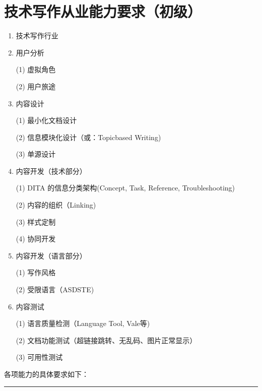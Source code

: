 \documentclass[letterpaper,10pt,english]{sphinxmanual}
\begin{document}
\chapter{技术写作从业能力要求（初级）}
\label{\detokenize{about/tw-comp-model:tw-comp-model}}\label{\detokenize{about/tw-comp-model:id1}}\label{\detokenize{about/tw-comp-model::doc}}\begin{enumerate}
%
\item {} 
\sphinxAtStartPar
技术写作行业

\item {} 
\sphinxAtStartPar
用户分析

\sphinxAtStartPar
(1)  虚拟角色

\sphinxAtStartPar
(2)  用户旅途

\item {} 
\sphinxAtStartPar
内容设计

\sphinxAtStartPar
(1) 最小化文档设计

\sphinxAtStartPar
(2) 信息模块化设计（或：Topic\sphinxhyphen{}based Writing)

\sphinxAtStartPar
(3) 单源设计

\item {} 
\sphinxAtStartPar
内容开发（技术部分）

\sphinxAtStartPar
(1) DITA 的信息分类架构(Concept, Task, Reference, Troubleshooting)

\sphinxAtStartPar
(2) 内容的组织（Linking)

\sphinxAtStartPar
(3) 样式定制

\sphinxAtStartPar
(4) 协同开发

\item {} 
\sphinxAtStartPar
内容开发（语言部分）

\sphinxAtStartPar
(1) 写作风格

\sphinxAtStartPar
(2) 受限语言（ASD\sphinxhyphen{}STE)

\item {} 
\sphinxAtStartPar
内容测试

\sphinxAtStartPar
(1) 语言质量检测（Language Tool, Vale等)

\sphinxAtStartPar
(2) 文档功能测试（超链接跳转、无乱码、图片正常显示）

\sphinxAtStartPar
(3) 可用性测试

\end{enumerate}

\sphinxAtStartPar
各项能力的具体要求如下：


\bigskip\hrule\bigskip
\end{document}
